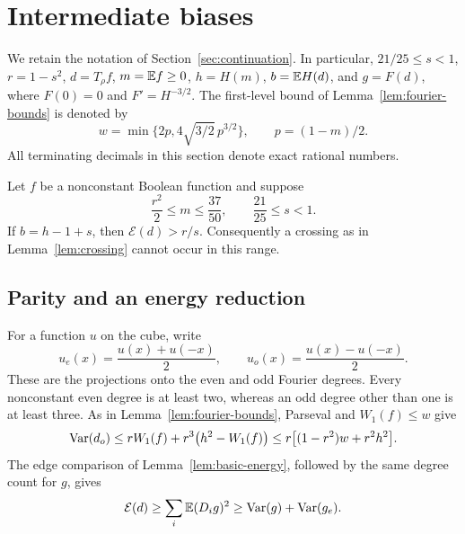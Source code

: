 \section{Intermediate biases}\label{sec:intermediate}

We retain the notation of Section~\ref{sec:continuation}. In particular,
\(21/25\le s<1\), \(r=1-s^2\), \(d=T_\rho f\),
\(m=\mathbb E f\ge0\), \(h=H(m)\), \(b=\mathbb E H(d)\), and
\(g=F(d)\), where \(F(0)=0\) and \(F'=H^{-3/2}\).
The first-level bound of Lemma~\ref{lem:fourier-bounds} is denoted by
\[
 w=\min\{2p,4\sqrt{3/2}\,p^{3/2}\},\qquad p=(1-m)/2.
\]
All terminating decimals in this section denote exact rational numbers.

\begin{proposition}
\label{prop:intermediate}
Let \(f\) be a nonconstant Boolean function and suppose
\[
 \frac{r^2}{2}\le m\le\frac{37}{50},\qquad \frac{21}{25}\le s<1.
\]
If \(b=h-1+s\), then \(\mathcal E(d)>r/s\).
Consequently a crossing as in Lemma~\ref{lem:crossing} cannot occur
in this range.
\end{proposition}

\subsection{Parity and an energy reduction}

For a function \(u\) on the cube, write
\[
 u_e(x)=\frac{u(x)+u(-x)}2,\qquad
 u_o(x)=\frac{u(x)-u(-x)}2.
\]
These are the projections onto the even and odd Fourier degrees. Every
nonconstant even degree is at least two, whereas an odd degree other
than one is at least three. As in Lemma~\ref{lem:fourier-bounds},
Parseval and \(W_1(f)\le w\) give
\begin{equation}\label{mid:odd-cap}
 \operatorname{Var}(d_o)
 \le rW_1(f)+r^3\bigl(h^2-W_1(f)\bigr)
 \le r\bigl[(1-r^2)w+r^2h^2\bigr].
\end{equation}
The edge comparison of Lemma~\ref{lem:basic-energy}, followed by the
same degree count for \(g\), gives
\begin{equation}\label{mid:parity-energy}
 \mathcal E(d)\ge\sum_i\mathbb E(D_i g)^2
 \ge\operatorname{Var}(g)+\operatorname{Var}(g_e).
\end{equation}

